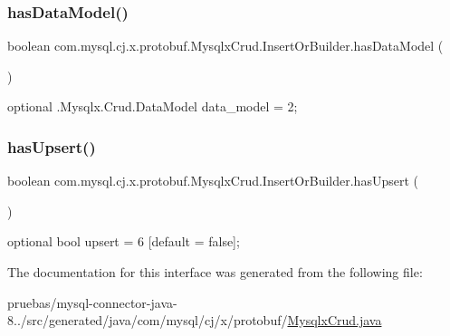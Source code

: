 \subsubsection{\texorpdfstring{has\+Data\+Model()}{hasDataModel()}}
{\footnotesize\ttfamily boolean com.\+mysql.\+cj.\+x.\+protobuf.\+Mysqlx\+Crud.\+Insert\+Or\+Builder.\+has\+Data\+Model (\begin{DoxyParamCaption}{ }\end{DoxyParamCaption})}

{\ttfamily optional .Mysqlx.\+Crud.\+Data\+Model data\+\_\+model = 2;} \mbox{\label{interfacecom_1_1mysql_1_1cj_1_1x_1_1protobuf_1_1_mysqlx_crud_1_1_insert_or_builder_a5558110d233d20c698cb759e135490b6}} 
\subsubsection{\texorpdfstring{has\+Upsert()}{hasUpsert()}}
{\footnotesize\ttfamily boolean com.\+mysql.\+cj.\+x.\+protobuf.\+Mysqlx\+Crud.\+Insert\+Or\+Builder.\+has\+Upsert (\begin{DoxyParamCaption}{ }\end{DoxyParamCaption})}

{\ttfamily optional bool upsert = 6 \mbox{[}default = false\mbox{]};} 

The documentation for this interface was generated from the following file\+:\begin{DoxyCompactItemize}
\item 
pruebas/mysql-\/connector-\/java-\/8../src/generated/java/com/mysql/cj/x/protobuf/\mbox{\hyperlink{_mysqlx_crud_8java}{Mysqlx\+Crud.\+java}}\end{DoxyCompactItemize}
